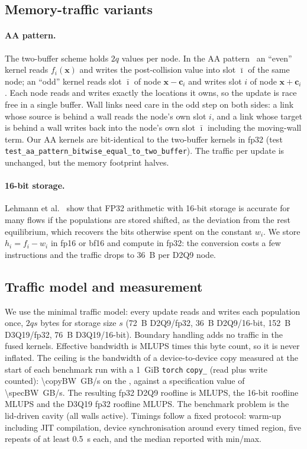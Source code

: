 \documentclass[11pt]{article}
\begin{document}
\subsection{Memory-traffic variants}
\paragraph{AA pattern.} The two-buffer scheme holds $2q$ values per node. In the AA
pattern~\citep{bailey2009} an ``even'' kernel reads $f_i(\mathbf{x})$ and writes the
post-collision value into slot $\bar\imath$ of the same node; an ``odd'' kernel reads slot
$\bar\imath$ of node $\mathbf{x}-\mathbf{c}_i$ and writes slot $i$ of node
$\mathbf{x}+\mathbf{c}_i$. Each node reads and writes exactly the locations it owns, so the
update is race free in a single buffer. Wall links need care in the odd step on both sides:
a link whose source is behind a wall reads the node's own slot $i$, and a link whose target
is behind a wall writes back into the node's own slot $\bar\imath$ including the moving-wall
term. Our AA kernels are bit-identical to the two-buffer kernels in fp32
(test \texttt{test\_aa\_pattern\_bitwise\_equal\_to\_two\_buffer}). The traffic per update is
unchanged, but the memory footprint halves.
\paragraph{16-bit storage.} Lehmann et al.~\citep{lehmann2022} show that FP32 arithmetic
with 16-bit storage is accurate for many flows if the populations are stored shifted, as the
deviation from the rest equilibrium, which recovers the bits otherwise spent on the constant
$w_i$. We store $h_i=f_i-w_i$ in fp16 or bf16 and compute in fp32: the conversion costs a few
instructions and the traffic drops to \SI{36}{B} per D2Q9 node.

\subsection{Traffic model and measurement}
\label{sec:model}
We use the minimal traffic model: every update reads and writes each population once,
$2qs$ bytes for storage size $s$ (\SI{72}{B} D2Q9/fp32, \SI{36}{B} D2Q9/16-bit,
\SI{152}{B} D3Q19/fp32, \SI{76}{B} D3Q19/16-bit). Boundary handling adds no traffic in the
fused kernels. Effective bandwidth is MLUPS times this byte count, so it is never
inflated. The ceiling is the bandwidth of a device-to-device copy measured at the start of
each benchmark run with a \SI{1}{GiB} \texttt{torch} \texttt{copy\_} (read plus write
counted): \SI{\copyBW}{GB/s} on the \gpuName{}, against a specification value of
\SI{\specBW}{GB/s}. The resulting fp32 D2Q9 roofline is \ceilFpThirtyTwo{} MLUPS, the
16-bit roofline \ceilSixteen{} MLUPS and the D3Q19 fp32 roofline \ceilThreeD{} MLUPS. The
benchmark problem is the lid-driven cavity (all walls active). Timings follow a fixed
protocol: warm-up including JIT compilation, device synchronisation around every timed
region, five repeats of at least \SI{0.5}{s} each, and the median reported with min/max.
\end{document}
